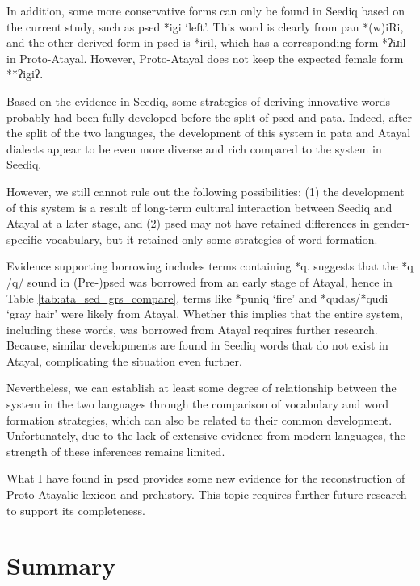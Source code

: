 In addition, some more conservative forms can only be found in Seediq based on the current study, such as \acl{psed} *igi `left'. This word is clearly from \acs{pan} *(w)iRi, and the other derived form in \acl{psed} is *iril, which has a corresponding form *ʔiɹil in Proto-Atayal. However, Proto-Atayal does not keep the expected female form **ʔigiʔ. 

Based on the evidence in Seediq, some strategies of deriving innovative words probably had been fully developed before the split of \acl{psed} and \acl{pata}. Indeed, after the split of the two languages, the development of this system in \acl{pata} and Atayal dialects appear to be even more diverse and rich compared to the system in Seediq. 

However, we still cannot rule out the following possibilities: (1) the development of this system is a result of long-term cultural interaction between Seediq and Atayal at a later stage, and (2) \acl{psed} may not have retained differences in gender-specific vocabulary, but it retained only some strategies of word formation. 

Evidence supporting borrowing includes terms containing *q. \textcite{song2024sedq} suggests that the *q /q/ sound in (Pre-)\acl{psed} was borrowed from an early stage of Atayal, hence in Table \ref{tab:ata_sed_grs_compare}, terms like *puniq `fire' and *qudas/*qudi `gray hair' were likely from Atayal. Whether this implies that the entire system, including these words, was borrowed from Atayal requires further research. Because, similar developments are found in Seediq words that do not exist in Atayal, complicating the situation even further.

Nevertheless, we can establish at least some degree of relationship between the system in the two languages through the comparison of vocabulary and word formation strategies, which can also be related to their common development. Unfortunately, due to the lack of extensive evidence from modern languages, the strength of these inferences remains limited.

What I have found in \acl{psed} provides some new evidence for the reconstruction of Proto-Atayalic lexicon and prehistory. This topic requires further future research to support its completeness.

\section{Summary}


